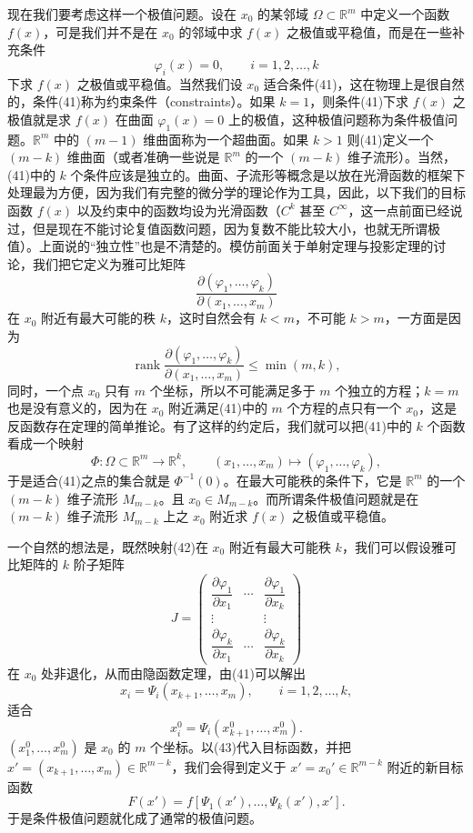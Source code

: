 现在我们要考虑这样一个极值问题。设在 $x_0$ 的某邻域 $\Omega\subset\mathbb R^m$ 中定义一个函数 $f(x)$，可是我们并不是在 $x_0$ 的邻域中求 $f(x)$ 之极值或平稳值，而是在一些补充条件
\begin{equation}
 \varphi_i(x)=0,\qquad i=1,2,\ldots,k
 \tag{41}
\end{equation}
下求 $f(x)$ 之极值或平稳值。当然我们设 $x_0$ 适合条件(41)，这在物理上是很自然的，条件(41)称为约束条件（constraints）。如果 $k=1$，则条件(41)下求 $f(x)$ 之极值就是求 $f(x)$ 在曲面 $\varphi_1(x)=0$ 上的极值，这种极值问题称为条件极值问题。$\mathbb R^m$ 中的 $(m-1)$ 维曲面称为一个超曲面。如果 $k>1$ 则(41)定义一个 $(m-k)$ 维曲面（或者准确一些说是 $\mathbb R^m$ 的一个 $(m-k)$ 维子流形）。当然，(41)中的 $k$ 个条件应该是独立的。曲面、子流形等概念是以放在光滑函数的框架下处理最为方便，因为我们有完整的微分学的理论作为工具，因此，以下我们的目标函数 $f(x)$ 以及约束中的函数均设为光滑函数（$C^k$ 甚至 $C^\infty$，这一点前面已经说过，但是现在不能讨论复值函数问题，因为复数不能比较大小，也就无所谓极值）。上面说的“独立性”也是不清楚的。模仿前面关于单射定理与投影定理的讨论，我们把它定义为雅可比矩阵
\[
 \frac{\partial(\varphi_1,\ldots,\varphi_k)}
 {\partial(x_1,\ldots,x_m)}
\]
在 $x_0$ 附近有最大可能的秩 $k$，这时自然会有 $k<m$，不可能 $k>m$，一方面是因为
\[
 \operatorname{rank}\frac{\partial(\varphi_1,\ldots,\varphi_k)}
 {\partial(x_1,\ldots,x_m)}\le \min(m,k),
\]
同时，一个点 $x_0$ 只有 $m$ 个坐标，所以不可能满足多于 $m$ 个独立的方程；$k=m$ 也是没有意义的，因为在 $x_0$ 附近满足(41)中的 $m$ 个方程的点只有一个 $x_0$，这是反函数存在定理的简单推论。有了这样的约定后，我们就可以把(41)中的 $k$ 个函数看成一个映射
\begin{equation}
 \Phi:\Omega\subset\mathbb R^m\longrightarrow\mathbb R^k,
 \qquad (x_1,\ldots,x_m)\longmapsto(\varphi_1,\ldots,\varphi_k),
 \tag{42}
\end{equation}
于是适合(41)之点的集合就是 $\Phi^{-1}(0)$。在最大可能秩的条件下，它是 $\mathbb R^m$ 的一个 $(m-k)$ 维子流形 $M_{m-k}$。且 $x_0\in M_{m-k}$。而所谓条件极值问题就是在 $(m-k)$ 维子流形 $M_{m-k}$ 上之 $x_0$ 附近求 $f(x)$ 之极值或平稳值。

一个自然的想法是，既然映射(42)在 $x_0$ 附近有最大可能秩 $k$，我们可以假设雅可比矩阵的 $k$ 阶子矩阵
\[
 J=
 \begin{pmatrix}
 \dfrac{\partial\varphi_1}{\partial x_1}&\cdots&\dfrac{\partial\varphi_1}{\partial x_k}\\
 \vdots&&\vdots\\
 \dfrac{\partial\varphi_k}{\partial x_1}&\cdots&\dfrac{\partial\varphi_k}{\partial x_k}
 \end{pmatrix}
\]
在 $x_0$ 处非退化，从而由隐函数定理，由(41)可以解出
\begin{equation}
 x_i=\Psi_i(x_{k+1},\ldots,x_m),
 \qquad i=1,2,\ldots,k,
 \tag{43}
\end{equation}
适合
\[
 x_i^0=\Psi_i(x_{k+1}^0,\ldots,x_m^0).
\]
$(x_1^0,\ldots,x_m^0)$ 是 $x_0$ 的 $m$ 个坐标。以(43)代入目标函数，并把 $x'=(x_{k+1},\ldots,x_m)\in\mathbb R^{m-k}$，我们会得到定义于 $x'=x_0'\in\mathbb R^{m-k}$ 附近的新目标函数
\begin{equation}
 F(x')=f[\Psi_1(x'),\ldots,\Psi_k(x'),x'].
 \tag{44}
\end{equation}
于是条件极值问题就化成了通常的极值问题。

